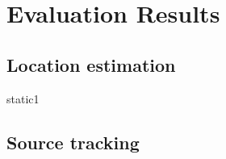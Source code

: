 \chapter{Evaluation Results}
\label{chap:results}

\section{Location estimation}
\begin{table}
	{static1}
\end{table}



\section{Source tracking}